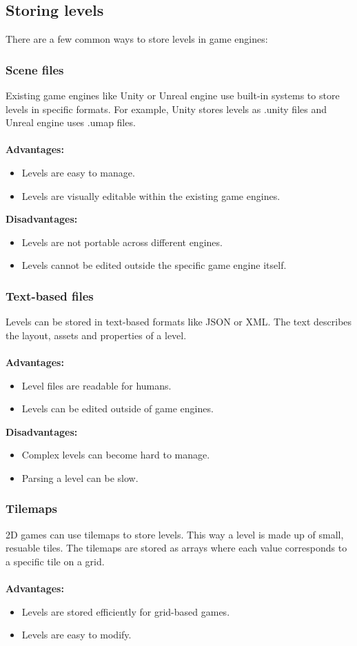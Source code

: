\documentclass{article} %
\begin{document}
\subsection{Storing levels}
There are a few common ways to store levels in game engines:
\subsubsection {Scene files}
Existing game engines like Unity or Unreal engine use built-in systems to store levels in specific formats.
For example, Unity stores levels as .unity files and Unreal engine uses .umap files.
\\\\
\textbf{Advantages:}
\begin{itemize}
    \item Levels are easy to manage.
    \item Levels are visually editable within the existing game engines.
\end{itemize}

\noindent\textbf{Disadvantages:}
\begin{itemize}
    \item Levels are not portable across different engines.
    \item Levels cannot be edited outside the specific game engine itself.
\end{itemize}

\subsubsection{Text-based files} 
Levels can be stored in text-based formats like JSON or XML.
The text describes the layout, assets and properties of a level.
\\\\
\textbf{Advantages:}
\begin{itemize}
	\item Level files are readable for humans.
	\item Levels can be edited outside of game engines.
\end{itemize}

\noindent\textbf{Disadvantages:} 
\begin{itemize}
	\item Complex levels can become hard to manage.	
	\item Parsing a level can be slow.
\end{itemize}

\subsubsection{Tilemaps} 
2D games can use tilemaps to store levels. This way a level is made up of small, resuable tiles.
The tilemaps are stored as arrays where each value corresponds to a specific tile on a grid.
\\\\
\textbf{Advantages:}
\begin{itemize}
	\item Levels are stored efficiently for grid-based games.
	\item Levels are easy to modify.
\end{itemize}
\end{document}
